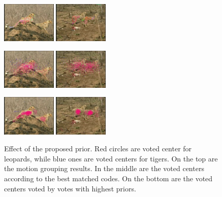 \documentclass[10pt,twocolumn,letterpaper]{article}
\begin{document}
\begin{figure}
\centering
\includegraphics[width=0.23\textwidth,bb=0 0 640 480]{amotionimg00296.jpg}
\includegraphics[width=0.23\textwidth,bb=0 0 640 480]{amotionimg01836.jpg}

\includegraphics[width=0.23\textwidth,bb=0 0 640 480]{selectVimg00296_0.jpg}
\includegraphics[width=0.23\textwidth,bb=0 0 640 480]{selectVimg01836_0.jpg}

\includegraphics[width=0.23\textwidth,bb=0 0 640 480]{selectVimg00296_19.jpg}
\includegraphics[width=0.23\textwidth,bb=0 0 640 480]{selectVimg01836_19.jpg}

\caption{Effect of the proposed prior. Red circles are voted center for leopards, while blue ones are voted centers for tigers. On the top are the motion grouping results. In the middle are the voted centers according to the best matched codes. On the bottom are the voted centers voted by votes with highest priors.}
\label{fig:bcMP}
\end{figure}
\end{document}
